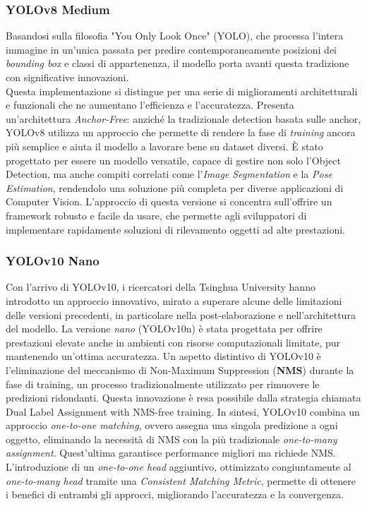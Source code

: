 \documentclass[12pt]{article}
\begin{document}
\subsubsection{YOLOv8 Medium} 
Basandosi sulla filosofia "You Only Look Once" (YOLO), che processa l'intera immagine in un'unica passata per predire contemporaneamente posizioni dei \textit{bounding box} e classi di appartenenza, il modello porta avanti questa tradizione con significative innovazioni.\\
Questa implementazione si distingue per una serie di miglioramenti architetturali e funzionali che ne aumentano l'efficienza e l'accuratezza. Presenta un'architettura \textit{Anchor-Free}: anziché la tradizionale detection basata sulle anchor, YOLOv8 utilizza un approccio che permette di rendere la fase di \textit{training} ancora più semplice e aiuta il modello a lavorare bene su dataset diversi. È stato progettato per essere un modello versatile, capace di gestire non solo l'Object Detection, ma anche compiti correlati come l'\textit{Image Segmentation} e la \textit{Pose Estimation}, rendendolo una soluzione più completa per diverse applicazioni di Computer Vision. L'approccio di questa versione si concentra sull'offrire un framework robusto e facile da usare, che permette agli sviluppatori di implementare rapidamente soluzioni di rilevamento oggetti ad alte prestazioni.

\subsubsection{YOLOv10 Nano} Con l'arrivo di YOLOv10, i ricercatori della Tsinghua University hanno introdotto un approccio innovativo, mirato a superare alcune delle limitazioni delle versioni precedenti, in particolare nella post-elaborazione e nell'architettura del modello. La versione \textit{nano} (YOLOv10n) è stata progettata per offrire prestazioni elevate anche in ambienti con risorse computazionali limitate, pur mantenendo un'ottima accuratezza. Un aspetto distintivo di YOLOv10 è l'eliminazione del meccanismo di Non-Maximum Suppression (\textbf{NMS}) durante la fase di training, un processo tradizionalmente utilizzato per rimuovere le predizioni ridondanti. Questa innovazione è resa possibile dalla strategia chiamata Dual Label Assignment with NMS-free training. In sintesi, YOLOv10 combina un approccio \textit{one-to-one matching}, ovvero assegna una singola predizione a ogni oggetto, eliminando la necessità di NMS con la più tradizionale \textit{one-to-many assignment}. Quest'ultima garantisce performance migliori ma richiede NMS. L'introduzione di un \textit{one-to-one head} aggiuntivo, ottimizzato congiuntamente al \textit{one-to-many head} tramite una \textit{Consistent Matching Metric}, permette di ottenere i benefici di entrambi gli approcci, migliorando l'accuratezza e la convergenza.
    
\end{document}
